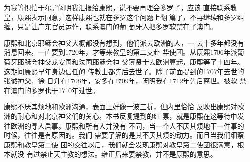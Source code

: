 为我等惧怕于尔。”闵明我汇报给康熙，说不要再理会多罗了，应该%
直接联系教皇，康熙表示同意，这样康熙也就在多罗这个问题上翻%
篇了，不再继续和多罗纠缠，只是让广东官员运作，联系澳门的葡%
萄牙人把多罗软禁在了澳门。%
\par
康熙和北京耶稣会神父大概都没有想到，他们派去欧洲的人，一%
去十多年都没有消息回来。一直要到1720年，才等来教皇的第二支赴%
华使团。从康熙1706年派葡萄牙耶稣会神父龙安国和法国耶稣会神%
父薄贤士去欧洲算起，康熙等了十四年。这期间康熙早年身边信任的%
传教士都先后去世了。除了前面提到的1707年去世的张诚神父，徐%
日升在1708年，安多在1709年，闵明我在1712年先后离世。被软%
禁在澳门的多罗也于1710年过世。%
\par
康熙不厌其烦地和欧洲沟通，表面上好像一波三折，但内里恰恰%
反映出康熙对欧洲的耐心和对北京神父们的关心。本书反复提到的红%
票，就是康熙在这等待中发往欧洲的寻人启事。康熙和所有人并没有%
不同，当一个人不厌其烦地干一件事的时候，往往是有原因的。我们%
需要了解的是其不厌其烦的动力。而且当我们细察康熙和教皇第二使%
团的交往以后，我们就会发现康熙对教皇第二使团很满意，根本就没%
有过禁止天主教的想法。雍正后来要禁教，并不是康熙的意思。%
